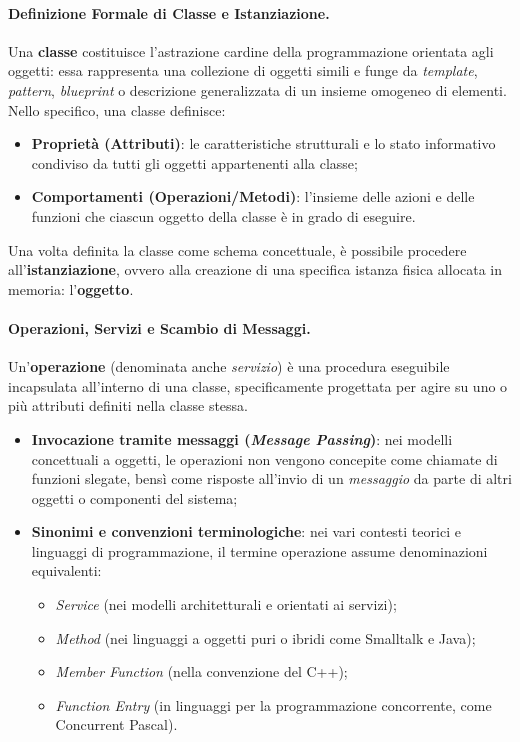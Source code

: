 \documentclass[12pt]{extarticle}
\begin{document}
\paragraph{Definizione Formale di Classe e Istanziazione.}
Una \textbf{classe} costituisce l'astrazione cardine della programmazione orientata agli oggetti: essa rappresenta una collezione di oggetti simili e funge da \textit{template}, \textit{pattern}, \textit{blueprint} o descrizione generalizzata di un insieme omogeneo di elementi. Nello specifico, una classe definisce:
\begin{itemize}
    \item \textbf{Proprietà (Attributi)}: le caratteristiche strutturali e lo stato informativo condiviso da tutti gli oggetti appartenenti alla classe;
    \item \textbf{Comportamenti (Operazioni/Metodi)}: l'insieme delle azioni e delle funzioni che ciascun oggetto della classe è in grado di eseguire.
\end{itemize}
Una volta definita la classe come schema concettuale, è possibile procedere all'\textbf{istanziazione}, ovvero alla creazione di una specifica istanza fisica allocata in memoria: l'\textbf{oggetto}.


\paragraph{Operazioni, Servizi e Scambio di Messaggi.}
Un'\textbf{operazione} (denominata anche \textit{servizio}) è una procedura eseguibile incapsulata all'interno di una classe, specificamente progettata per agire su uno o più attributi definiti nella classe stessa.
\begin{itemize}
    \item \textbf{Invocazione tramite messaggi (\textit{Message Passing})}: nei modelli concettuali a oggetti, le operazioni non vengono concepite come chiamate di funzioni slegate, bensì come risposte all'invio di un \textit{messaggio} da parte di altri oggetti o componenti del sistema;
    \item \textbf{Sinonimi e convenzioni terminologiche}: nei vari contesti teorici e linguaggi di programmazione, il termine operazione assume denominazioni equivalenti:
    \begin{itemize}
        \item \textit{Service} (nei modelli architetturali e orientati ai servizi);
        \item \textit{Method} (nei linguaggi a oggetti puri o ibridi come Smalltalk e Java);
        \item \textit{Member Function} (nella convenzione del C++);
        \item \textit{Function Entry} (in linguaggi per la programmazione concorrente, come Concurrent Pascal).
    \end{itemize}
\end{itemize}
\end{document}
